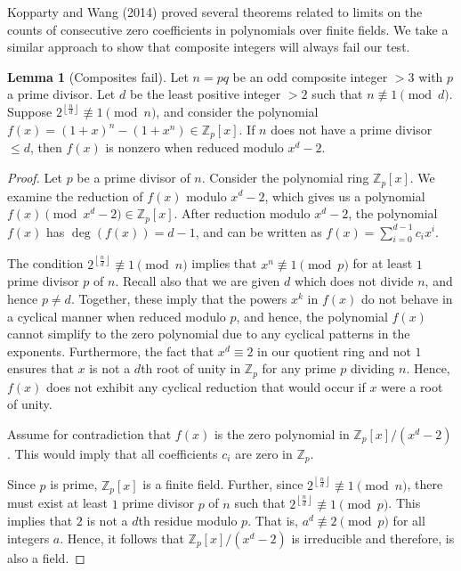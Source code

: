 \documentclass{article}
\theoremstyle{plain}
\theoremstyle{definition}
\newtheorem{lemma}{Lemma}
\begin{document}
Kopparty and Wang (2014) \cite{koppartywang2014roots} proved several theorems related to limits on the counts of consecutive zero coefficients in polynomials over finite fields. We take a similar approach to show that composite integers will always fail our test.

\begin{lemma}[Composites fail] \label{lemma:composites}
Let $n = pq$ be an odd composite integer $>3$ with $p$ a prime divisor. Let $d$ be the least positive integer $>2$ such that $n \not\equiv 1 \pmod{d}$. Suppose $2^{\left\lfloor\frac{n}{d}\right\rfloor} \not\equiv 1 \pmod{n}$, and consider the polynomial $f(x) = (1 + x)^n - (1 + x^n) \in \mathbb{Z}_p[x]$. If $n$ does not have a prime divisor $\leq d$, then $f(x)$ is nonzero when reduced modulo $x^d - 2$.
\end{lemma}
\begin{proof}
Let $p$ be a prime divisor of $n$. Consider the polynomial ring $\mathbb{Z}_p[x]$. We examine the reduction of $ f(x) $ modulo $x^d - 2$, which gives us a polynomial $f(x) \pmod{x^d - 2} \in \mathbb{Z}_p[x]$. After reduction modulo $x^d - 2$, the polynomial $f(x)$ has $\deg(f(x)) = d-1$, and can be written as $f(x) = \sum_{i=0}^{d-1} c_i x^i$.

The condition $2^{\left\lfloor\frac{n}{d}\right\rfloor} \not\equiv 1 \pmod{n}$ implies that $x^n \not\equiv 1 \pmod{p}$ for at least $1$ prime divisor $p$ of $n$. Recall also that we are given $d$ which does not divide $n$, and hence $p \not= d$. Together, these imply that the powers $x^k$ in $f(x)$ do not behave in a cyclical manner when reduced modulo $p$, and hence, the polynomial $f(x)$ cannot simplify to the zero polynomial due to any cyclical patterns in the exponents. Furthermore, the fact that $x^d \equiv 2$ in our quotient ring and not $1$ ensures that $x$ is not a $d$th root of unity in $\mathbb{Z}_p$ for any prime $p$ dividing $n$. Hence, $f(x)$ does not exhibit any cyclical reduction that would occur if $x$ were a root of unity.

Assume for contradiction that $f(x)$ is the zero polynomial in $\mathbb{Z}_p[x]/(x^d - 2)$. This would imply that all coefficients $c_i$ are zero in $\mathbb{Z}_p$.

Since $p$ is prime, $\mathbb{Z}_p[x]$ is a finite field. Further, since $2^{\left\lfloor\frac{n}{d}\right\rfloor} \not\equiv 1 \pmod{n}$, there must exist at least $1$ prime divisor $p$ of $n$ such that $2^{\left\lfloor\frac{n}{d}\right\rfloor} \not\equiv 1 \pmod{p}$. This implies that $2$ is not a $d$th residue modulo $p$. That is, $a^d \not\equiv 2 \pmod{p}$ for all integers $a$. Hence, it follows that $\mathbb{Z}_p[x]/(x^d - 2)$ is irreducible and therefore, is also a field.


\end{proof}
\end{document}
